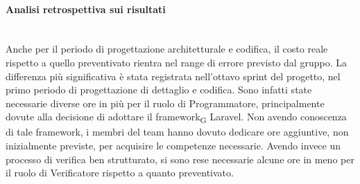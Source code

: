\paragraph{Analisi retrospettiva sui risultati}\mbox{}\\
Anche per il periodo di progettazione architetturale e codifica, il costo reale rispetto a quello preventivato rientra nel range di errore previsto dal gruppo. 
La differenza più significativa è stata registrata nell'ottavo sprint del progetto, nel primo periodo di progettazione di dettaglio e codifica. Sono infatti state necessarie diverse ore in più per il ruolo di Programmatore, principalmente dovute alla decisione di adottare il framework\textsubscript{G} Laravel. Non avendo conoscenza di tale framework, i membri del team hanno dovuto dedicare ore aggiuntive, non inizialmente previste, per
acquisire le competenze necessarie.
Avendo invece un processo di verifica ben strutturato, si sono rese necessarie alcune ore in meno per il ruolo di Verificatore rispetto a quanto preventivato.

